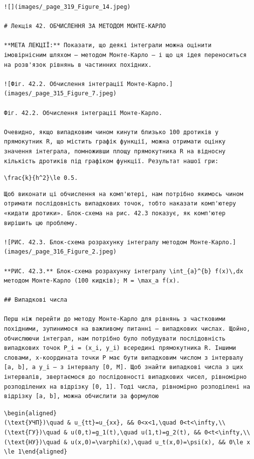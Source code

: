 \documentclass[
  ukrainian,
]{article}
\begin{document}
\begin{verbatim}
![](images/_page_319_Figure_14.jpeg)

# Лекція 42. ОБЧИСЛЕННЯ ЗА МЕТОДОМ МОНТЕ-КАРЛО

**МЕТА ЛЕКЦІЇ:** Показати, що деякі інтеграли можна оцінити імовірнісним шляхом — методом Монте-Карло — і що ця ідея переноситься на розв'язок рівнянь в частинних похідних.

![Фіг. 42.2. Обчислення інтеграції Монте-Карло.](images/_page_315_Figure_7.jpeg)

Фіг. 42.2. Обчислення інтеграції Монте-Карло.

Очевидно, якщо випадковим чином кинути близько 100 дротиків у прямокутник R, що містить графік функції, можна отримати оцінку значення інтеграла, помноживши площу прямокутника R на відносну кількість дротиків під графіком функції. Результат нашої гри:
\end{verbatim}

\texttt{\textbackslash{}frac\{k\}\{h\^{}2\}\textbackslash{}le\ 0.5.}

\begin{verbatim}
Щоб виконати ці обчислення на комп'ютері, нам потрібно якимось чином отримати послідовність випадкових точок, тобто наказати комп'ютеру «кидати дротики». Блок-схема на рис. 42.3 показує, як комп'ютер вирішить цю проблему.

![РИС. 42.3. Блок-схема розрахунку інтегралу методом Монте-Карло.](images/_page_316_Figure_2.jpeg)

**РИС. 42.3.** Блок-схема розрахунку інтегралу \int_{a}^{b} f(x)\,dx методом Монте-Карло (100 кидків); M = \max_a f(x).

## Випадкові числа

Перш ніж перейти до методу Монте-Карло для рівнянь з частковими похідними, зупинимося на важливому питанні — випадкових числах. Щойно, обчислюючи інтеграл, нам потрібно було побудувати послідовність випадкових точок P_i = (x_i, y_i) всередині прямокутника R. Іншими словами, x-координата точки P має бути випадковим числом з інтервалу [a, b], а y_i — з інтервалу [0, M]. Щоб знайти випадкові числа з цих інтервалів, звертаємося до послідовності випадкових чисел, рівномірно розподілених на відрізку [0, 1]. Тоді числа, рівномірно розподілені на відрізку [a, b], можна обчислити за формулою
\end{verbatim}

\texttt{\textbackslash{}begin\{aligned\}(\textbackslash{}text\{УЧП\})\textbackslash{}quad\ \&\ u\_\{tt\}=u\_\{xx\},\ \&\&\ 0\textless{}x\textless{}1,\textbackslash{}quad\ 0\textless{}t\textless{}\textbackslash{}infty,\textbackslash{}\textbackslash{}(\textbackslash{}text\{ГУ\})\textbackslash{}quad\ \&\ u(0,t)=g\_1(t),\textbackslash{}quad\ u(1,t)=g\_2(t),\ \&\&\ 0\textless{}t\textless{}\textbackslash{}infty,\textbackslash{}\textbackslash{}(\textbackslash{}text\{НУ\})\textbackslash{}quad\ \&\ u(x,0)=\textbackslash{}varphi(x),\textbackslash{}quad\ u\_t(x,0)=\textbackslash{}psi(x),\ \&\&\ 0\textbackslash{}le\ x\textbackslash{}le\ 1\textbackslash{}end\{aligned\}}
\end{document}
